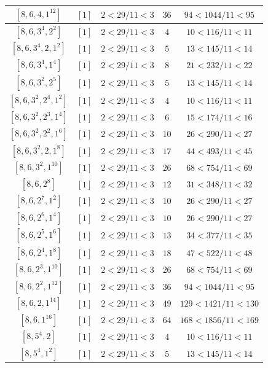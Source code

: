 \documentclass{article}%
\begin{document}
\begin{center}
\begin{longtable}{||c|c|c|c|c||}
$[8, 6, 4, 1^{12}]$ & $[1]$ & $2 < 29/11 < 3$ & $36$ & $94 < 1044/11 < 95$ \\ \hline 
$[8, 6, 3^{4}, 2^{2}]$ & $[1]$ & $2 < 29/11 < 3$ & $4$ & $10 < 116/11 < 11$ \\ \hline 
$[8, 6, 3^{4}, 2, 1^{2}]$ & $[1]$ & $2 < 29/11 < 3$ & $5$ & $13 < 145/11 < 14$ \\ \hline 
$[8, 6, 3^{4}, 1^{4}]$ & $[1]$ & $2 < 29/11 < 3$ & $8$ & $21 < 232/11 < 22$ \\ \hline 
$[8, 6, 3^{2}, 2^{5}]$ & $[1]$ & $2 < 29/11 < 3$ & $5$ & $13 < 145/11 < 14$ \\ \hline 
$[8, 6, 3^{2}, 2^{4}, 1^{2}]$ & $[1]$ & $2 < 29/11 < 3$ & $4$ & $10 < 116/11 < 11$ \\ \hline 
$[8, 6, 3^{2}, 2^{3}, 1^{4}]$ & $[1]$ & $2 < 29/11 < 3$ & $6$ & $15 < 174/11 < 16$ \\ \hline 
$[8, 6, 3^{2}, 2^{2}, 1^{6}]$ & $[1]$ & $2 < 29/11 < 3$ & $10$ & $26 < 290/11 < 27$ \\ \hline 
$[8, 6, 3^{2}, 2, 1^{8}]$ & $[1]$ & $2 < 29/11 < 3$ & $17$ & $44 < 493/11 < 45$ \\ \hline 
$[8, 6, 3^{2}, 1^{10}]$ & $[1]$ & $2 < 29/11 < 3$ & $26$ & $68 < 754/11 < 69$ \\ \hline 
$[8, 6, 2^{8}]$ & $[1]$ & $2 < 29/11 < 3$ & $12$ & $31 < 348/11 < 32$ \\ \hline 
$[8, 6, 2^{7}, 1^{2}]$ & $[1]$ & $2 < 29/11 < 3$ & $10$ & $26 < 290/11 < 27$ \\ \hline 
$[8, 6, 2^{6}, 1^{4}]$ & $[1]$ & $2 < 29/11 < 3$ & $10$ & $26 < 290/11 < 27$ \\ \hline 
$[8, 6, 2^{5}, 1^{6}]$ & $[1]$ & $2 < 29/11 < 3$ & $13$ & $34 < 377/11 < 35$ \\ \hline 
$[8, 6, 2^{4}, 1^{8}]$ & $[1]$ & $2 < 29/11 < 3$ & $18$ & $47 < 522/11 < 48$ \\ \hline 
$[8, 6, 2^{3}, 1^{10}]$ & $[1]$ & $2 < 29/11 < 3$ & $26$ & $68 < 754/11 < 69$ \\ \hline 
$[8, 6, 2^{2}, 1^{12}]$ & $[1]$ & $2 < 29/11 < 3$ & $36$ & $94 < 1044/11 < 95$ \\ \hline 
$[8, 6, 2, 1^{14}]$ & $[1]$ & $2 < 29/11 < 3$ & $49$ & $129 < 1421/11 < 130$ \\ \hline 
$[8, 6, 1^{16}]$ & $[1]$ & $2 < 29/11 < 3$ & $64$ & $168 < 1856/11 < 169$ \\ \hline 
$[8, 5^{4}, 2]$ & $[1]$ & $2 < 29/11 < 3$ & $4$ & $10 < 116/11 < 11$ \\ \hline 
$[8, 5^{4}, 1^{2}]$ & $[1]$ & $2 < 29/11 < 3$ & $5$ & $13 < 145/11 < 14$ \\ \hline 

\end{longtable}
\end{center}
\end{document}
